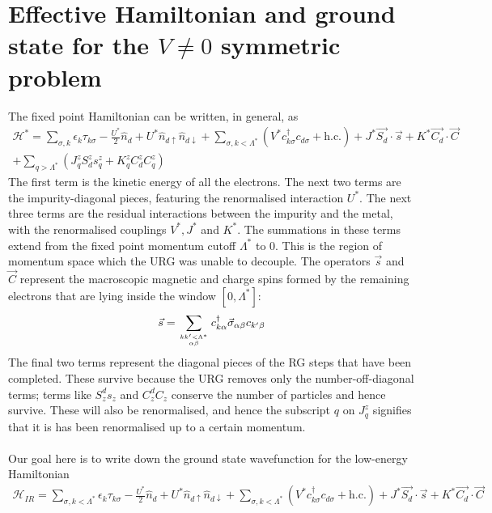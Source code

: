 \documentclass[twoside,11pt]{report}
\numberwithin{equation}{section}
\begin{document}
\section{Effective Hamiltonian and ground state for the \(V\neq 0\) symmetric problem}
The fixed point Hamiltonian can be written, in general, as
\begin{equation}\begin{aligned}
	\mathcal{H}^* = \sum_{\sigma, k}\epsilon_k \tau_{k\sigma} - \frac{U^*}{2}\hat n_d + U^* \hat n_{d\uparrow}\hat n_{d\downarrow} + \sum_{\sigma, k < \Lambda^*}\left( V^* c^\dagger_{k\sigma}c_{d\sigma} + \text{h.c.} \right) + J^* \vec{S_d}\cdot\vec{s} + K^* \vec{C_d}\cdot\vec{C} \\
	+ \sum_{q > \Lambda^*}\left(J^z_q S^z_ds^z_q + K^z_q C^z_dC^z_q\right) 
\end{aligned}\end{equation}
The first term is the kinetic energy of all the electrons. The next two terms are the impurity-diagonal pieces, featuring the renormalised interaction \(U^*\). The next three terms are the residual interactions between the impurity and the metal, with the renormalised couplings \(V^*, J^*\) and \(K^*\). The summations in these terms extend from the fixed point momentum cutoff \(\Lambda^*\) to 0. This is the region of momentum space  which the URG was unable to decouple. The operators \(\vec s\) and \(\vec C\) represent the macroscopic magnetic and charge spins formed by the remaining electrons that are lying inside the window \(\left[ 0, \Lambda^* \right] \):
\begin{equation}\begin{aligned}
	\vec s = \sum_{kk^\prime<\Lambda^*\atop{\alpha\beta}} c^\dagger_{k\alpha}\vec \sigma_{\alpha\beta}c_{k^\prime\beta}
\end{aligned}\end{equation}
The final two terms represent the diagonal pieces of the RG steps that have been completed. These survive because the URG removes only the number-off-diagonal terms; terms like \(S^d_z s_z\) and \(C^d_z C_z\) conserve the number of particles and hence survive. These will also be renormalised, and hence the subscript \(q\) on \(J^z_q\) signifies that it is has been renormalised up to a certain momentum.
\\\\Our goal here is to write down the ground state wavefunction for the low-energy Hamiltonian
\begin{equation}\begin{aligned}
	\label{fixed_point_ham}
	\mathcal{H}_{IR} = \sum_{\sigma, k<\Lambda^*}\epsilon_k \tau_{k\sigma} - \frac{U^*}{2}\hat n_d + U^* \hat n_{d\uparrow}\hat n_{d\downarrow} + \sum_{\sigma, k < \Lambda^*}\left( V^* c^\dagger_{k\sigma}c_{d\sigma} + \text{h.c.} \right) + J^* \vec{S_d}\cdot\vec{s} + K^* \vec{C_d}\cdot\vec{C}
\end{aligned}\end{equation}
\end{document}
